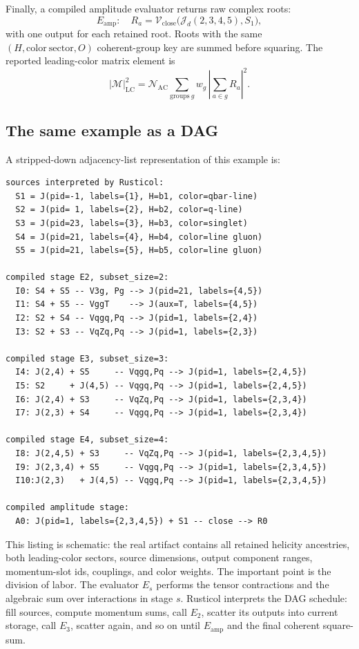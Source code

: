 \documentclass[10pt]{article}
\newcommand{\J}{\mathcal{J}}
\newcommand{\V}{\mathcal{V}}
\newcommand{\M}{\mathcal{M}}
\begin{document}
Finally, a compiled amplitude evaluator returns raw complex roots:
\begin{equation}
  E_{\mathrm{amp}}:\quad
  R_a =
  \V_{\mathrm{close}}\bigl(\J_d(2,3,4,5),S_1\bigr),
  \label{eq:amplitude-stage}
\end{equation}
with one output for each retained root.  Roots with the same
$(H,\mathrm{color\ sector},O)$ coherent-group key are summed before squaring.
The reported leading-color matrix element is
\begin{equation}
  |\M|^2_{\mathrm{LC}}
  =
  \mathcal{N}_{\mathrm{AC}}
  \sum_{\mathrm{groups}\ g}
  w_g\,
  \left|\sum_{a\in g} R_a\right|^2 .
  \label{eq:lc-final-reduction}
\end{equation}

\subsection*{The same example as a DAG}

A stripped-down adjacency-list representation of this example is:
\begin{lstlisting}
sources interpreted by Rusticol:
  S1 = J(pid=-1, labels={1}, H=b1, color=qbar-line)
  S2 = J(pid= 1, labels={2}, H=b2, color=q-line)
  S3 = J(pid=23, labels={3}, H=b3, color=singlet)
  S4 = J(pid=21, labels={4}, H=b4, color=line gluon)
  S5 = J(pid=21, labels={5}, H=b5, color=line gluon)

compiled stage E2, subset_size=2:
  I0: S4 + S5 -- V3g, Pg --> J(pid=21, labels={4,5})
  I1: S4 + S5 -- VggT    --> J(aux=T, labels={4,5})
  I2: S2 + S4 -- Vqgq,Pq --> J(pid=1, labels={2,4})
  I3: S2 + S3 -- VqZq,Pq --> J(pid=1, labels={2,3})

compiled stage E3, subset_size=3:
  I4: J(2,4) + S5     -- Vqgq,Pq --> J(pid=1, labels={2,4,5})
  I5: S2     + J(4,5) -- Vqgq,Pq --> J(pid=1, labels={2,4,5})
  I6: J(2,4) + S3     -- VqZq,Pq --> J(pid=1, labels={2,3,4})
  I7: J(2,3) + S4     -- Vqgq,Pq --> J(pid=1, labels={2,3,4})

compiled stage E4, subset_size=4:
  I8: J(2,4,5) + S3     -- VqZq,Pq --> J(pid=1, labels={2,3,4,5})
  I9: J(2,3,4) + S5     -- Vqgq,Pq --> J(pid=1, labels={2,3,4,5})
  I10:J(2,3)   + J(4,5) -- Vqgq,Pq --> J(pid=1, labels={2,3,4,5})

compiled amplitude stage:
  A0: J(pid=1, labels={2,3,4,5}) + S1 -- close --> R0
\end{lstlisting}
This listing is schematic: the real artifact contains all retained helicity
ancestries, both leading-color sectors, source dimensions, output component
ranges, momentum-slot ids, couplings, and color weights.  The important point
is the division of labor.  The evaluator $E_s$ performs the tensor contractions
and the algebraic sum over interactions in stage $s$.  Rusticol interprets the
DAG schedule: fill sources, compute momentum sums, call $E_2$, scatter its
outputs into current storage, call $E_3$, scatter again, and so on until
$E_{\mathrm{amp}}$ and the final coherent square-sum.
\end{document}
